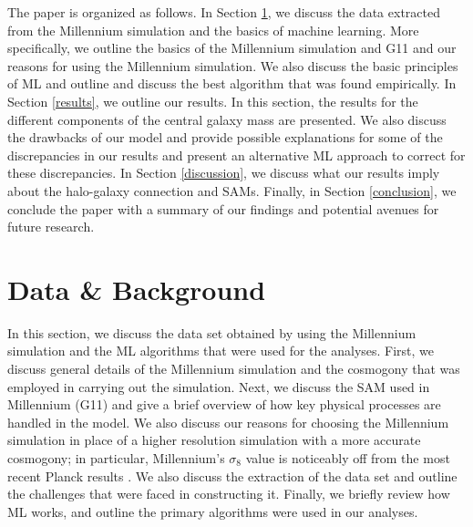 \documentclass[a4paper,fleqn,usenatbib]{mnras}
\begin{document}
\par
The paper is organized as follows. In Section \ref{mgf:db}, we discuss the data extracted from the Millennium simulation and the basics of machine learning. More specifically, we outline the basics of the Millennium simulation and G11 and our reasons for using the Millennium simulation. We also discuss the basic principles of ML and outline and discuss the best algorithm that was found empirically. In Section \ref{results}, we outline our results. In this section, the results for the different components of the central galaxy mass are presented. We also discuss the drawbacks of our model and provide possible explanations for some of the discrepancies in our results and present an alternative ML approach to correct for these discrepancies. In Section \ref{discussion}, we discuss what our results imply about the halo-galaxy connection and SAMs. Finally, in Section \ref{conclusion}, we conclude the paper with a summary of our findings and potential avenues for future research. 

\section[]{Data \& Background} \label{mgf:db}
In this section, we discuss the data set obtained by using the Millennium simulation and the ML algorithms that were used for the analyses. First, we discuss general details of the Millennium simulation and the cosmogony that was employed in carrying out the simulation. Next, we discuss the SAM used in Millennium (G11) and give a brief overview of how key physical processes are handled in the model. We also discuss our reasons for choosing the Millennium simulation in place of a higher resolution simulation with a more accurate cosmogony; in particular, Millennium's $\sigma_8$ value is noticeably off from the most recent Planck results \citep{planck2015planck}. We also discuss the extraction of the data set and outline the challenges that were faced in constructing it. Finally, we briefly review how ML works, and outline the primary algorithms were used in our analyses. 
\end{document}
